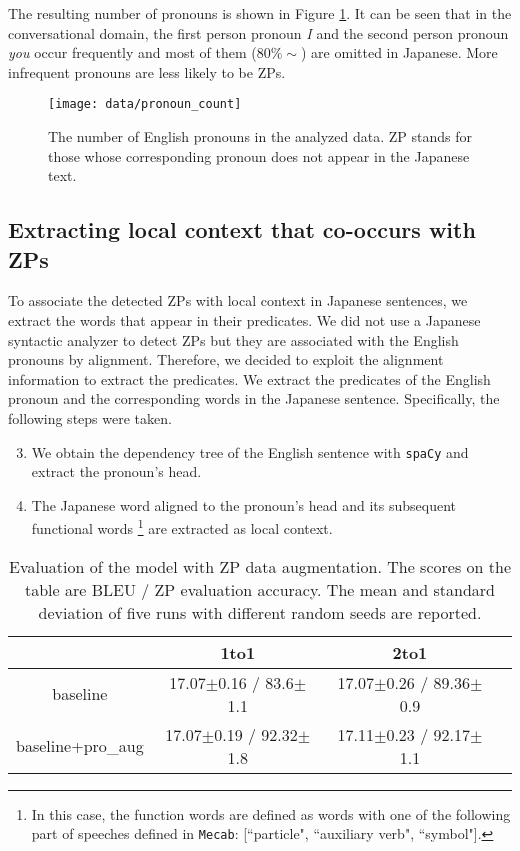 The resulting number of pronouns is shown in Figure \ref{fig:pronoun_count}. It can be seen that in the conversational domain, the first person pronoun \textit{I} and the second person pronoun \textit{you} occur frequently and most of them ($80\%\sim$) are omitted in Japanese. More infrequent pronouns are less likely to be ZPs.

\begin{figure}[t]
\centering
\texttt{[image: data/pronoun\_count]}
\caption{The number of English pronouns in the analyzed data. ZP stands for those whose corresponding pronoun does not appear in the Japanese text.}
\label{fig:pronoun_count}
\end{figure}

\subsection{Extracting local context that co-occurs with ZPs}
To associate the detected ZPs with local context in Japanese sentences, we extract the words that appear in their predicates.
We did not use a Japanese syntactic analyzer to detect ZPs but they are associated with the English pronouns by alignment. Therefore, we decided to exploit the alignment information to extract the predicates.
We extract the predicates of the English pronoun and the corresponding words in the Japanese sentence. Specifically, the following steps were taken.

\begin{enumerate}
  \setcounter{enumi}{2}
  \item We obtain the dependency tree of the English sentence with \texttt{spaCy} and extract the pronoun's head.
  \item The Japanese word aligned to the pronoun's head and its subsequent functional words \footnote{In this case, the function words are defined as words with one of the following part of speeches defined in \texttt{Mecab}: [``particle", ``auxiliary verb", ``symbol"].} are extracted as local context.
\end{enumerate}

\begin{table*}[t]
\centering
\begin{tabular}{cccc} \toprule
                  & 1to1        & 2to1        \\ \midrule
baseline          & 17.07$\pm$0.16 / 83.6$\pm$1.1 & 17.07$\pm$0.26 / 89.36$\pm$0.9 \\
baseline+pro\_aug & 17.07$\pm$0.19 / 92.32$\pm$1.8 & 17.11$\pm$0.23 / 92.17$\pm$1.1 \\ \bottomrule
\end{tabular}
\caption{Evaluation of the model with ZP data augmentation. The scores on the table are BLEU / ZP evaluation accuracy. The mean and standard deviation of five runs with different random seeds are reported.}
\label{result:mt}
\end{table*}



